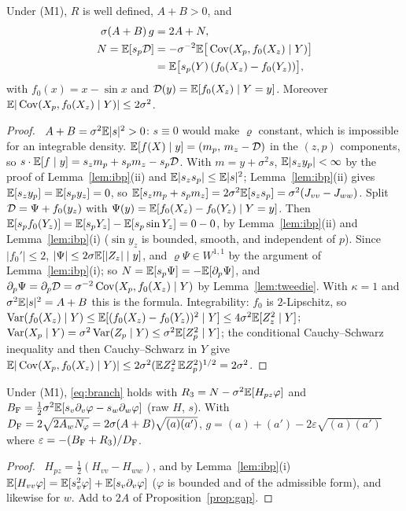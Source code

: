 \begin{proposition}\label{prop:gap}
Under \textup{(M1)}, $R$ is well defined, $A+B>0$, and
\[
\begin{aligned}
\sigma(A+B)\,g&=2A+N,\\ N=\mathbb{E}[s_p\mathcal D]&=-\sigma^{-2}\mathbb{E}\big[\operatorname{Cov}(X_p,f_0(X_z)\mid Y)\big]\\ &=\mathbb{E}\big[s_p(Y)\,(f_0(X_z)-f_0(Y_z))\big],
\end{aligned}
\]
with $f_0(x)=x-\sin x$ and $\mathcal D(y)=\mathbb{E}[f_0(X_z)\mid Y=y]$. Moreover $\mathbb{E}|\operatorname{Cov}(X_p,f_0(X_z)\mid Y)|\le2\sigma^2$.
\end{proposition}
\begin{proof}\proofst\
$A+B=\sigma^2\mathbb{E}|s|^2>0$: $s\equiv0$ would make $\varrho$ constant, which is impossible for an integrable density.
$\mathbb{E}[f(X)\mid y]=(m_p,\,m_z-\mathcal D)$ in the $(z,p)$ components, so $s\cdot\mathbb{E}[f\mid y]=s_zm_p+s_pm_z-s_p\mathcal D$.
With $m=y+\sigma^2s$, $\mathbb{E}|s_zy_p|<\infty$ by the proof of Lemma~\ref{lem:ibp}(ii) and $\mathbb{E}|s_zs_p|\le\mathbb{E}|s|^2$; Lemma~\ref{lem:ibp}(ii) gives $\mathbb{E}[s_zy_p]=\mathbb{E}[s_py_z]=0$, so $\mathbb{E}[s_zm_p+s_pm_z]=2\sigma^2\mathbb{E}[s_zs_p]=\sigma^2(J_{vv}-J_{ww})$.
Split $\mathcal D=\Psi+f_0(y_z)$ with $\Psi(y)=\mathbb{E}[f_0(X_z)-f_0(Y_z)\mid Y=y]$.
Then $\mathbb{E}[s_pf_0(Y_z)]=\mathbb{E}[s_pY_z]-\mathbb{E}[s_p\sin Y_z]=0-0$, by Lemma~\ref{lem:ibp}(ii) and Lemma~\ref{lem:ibp}(i) ($\sin y_z$ is bounded, smooth, and independent of $p$).
Since $|f_0'|\le2$, $|\Psi|\le2\sigma\mathbb{E}[|Z_z|\mid y]$, and $\varrho\Psi\in W^{1,1}$ by the argument of Lemma~\ref{lem:ibp}(i); so $N=\mathbb{E}[s_p\Psi]=-\mathbb{E}[\partial_p\Psi]$, and $\partial_p\Psi=\partial_p\mathcal D=\sigma^{-2}\operatorname{Cov}(X_p,f_0(X_z)\mid Y)$ by Lemma~\ref{lem:tweedie}.
With $\kappa=1$ and $\sigma^2\mathbb{E}|s|^2=A+B$ this is the formula.
Integrability: $f_0$ is $2$-Lipschitz, so $\operatorname{Var}(f_0(X_z)\mid Y)\le\mathbb{E}[(f_0(X_z)-f_0(Y_z))^2\mid Y]\le4\sigma^2\mathbb{E}[Z_z^2\mid Y]$; $\operatorname{Var}(X_p\mid Y)=\sigma^2\operatorname{Var}(Z_p\mid Y)\le\sigma^2\mathbb{E}[Z_p^2\mid Y]$; the conditional Cauchy--Schwarz inequality and then Cauchy--Schwarz in $Y$ give $\mathbb{E}|\operatorname{Cov}(X_p,f_0(X_z)\mid Y)|\le2\sigma^2(\mathbb{E} Z_z^2\,\mathbb{E} Z_p^2)^{1/2}=2\sigma^2$.
\end{proof}

\begin{proposition}\label{prop:branch}
Under \textup{(M1)}, \eqref{eq:branch} holds with $R_3=N-\sigma^2\mathbb{E}[H_{pz}\varphi]$ and $B_{\mathrm F}=\frac12\sigma^2\mathbb{E}[s_v\partial_v\varphi-s_w\partial_w\varphi]$ (raw $H$, $s$). With $D_{\rm F}=2\sqrt{2A_wN_\varphi}=2\sigma(A+B)\sqrt{(a)(a')}$, $g=(a)+(a')-2\varepsilon\sqrt{(a)(a')}$ where $\varepsilon=-(B_{\mathrm F}+R_3)/D_{\rm F}$.
\end{proposition}
\begin{proof}\proofst\
$H_{pz}=\frac12(H_{vv}-H_{ww})$, and by Lemma~\ref{lem:ibp}(i) $\mathbb{E}[H_{vv}\varphi]=\mathbb{E}[s_v^2\varphi]+\mathbb{E}[s_v\partial_v\varphi]$ ($\varphi$ is bounded and of the admissible form), and likewise for $w$. Add to $2A$ of Proposition~\ref{prop:gap}.
\end{proof}

